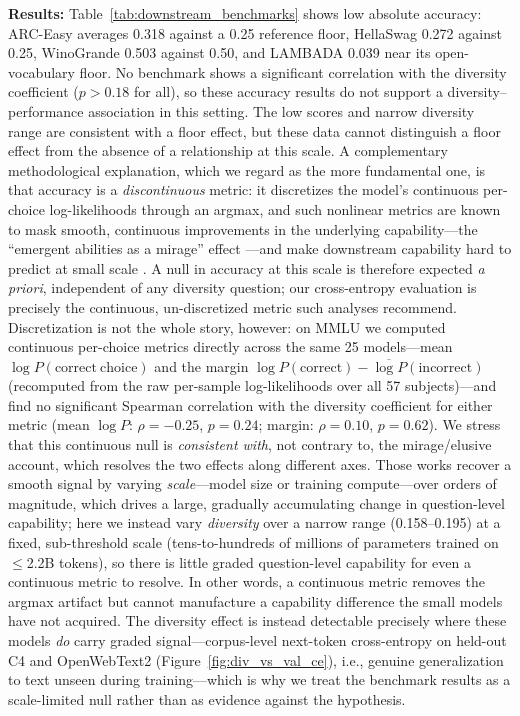 \textbf{Results:}
Table~\ref{tab:downstream_benchmarks} shows low absolute accuracy: ARC-Easy averages 0.318 against a 0.25 reference floor, HellaSwag 0.272 against 0.25, WinoGrande 0.503 against 0.50, and LAMBADA 0.039 near its open-vocabulary floor.
No benchmark shows a significant correlation with the diversity coefficient ($p > 0.18$ for all), so these accuracy results do not support a diversity--performance association in this setting.
The low scores and narrow diversity range are consistent with a floor effect, but these data cannot distinguish a floor effect from the absence of a relationship at this scale.
A complementary methodological explanation, which we regard as the more fundamental one, is that accuracy is a \emph{discontinuous} metric: it discretizes the model's continuous per-choice log-likelihoods through an argmax, and such nonlinear metrics are known to mask smooth, continuous improvements in the underlying capability---the ``emergent abilities as a mirage'' effect \citep{schaeffer2023emergent}---and make downstream capability hard to predict at small scale \citep{schaeffer2024elusive}. A null in accuracy at this scale is therefore expected \emph{a priori}, independent of any diversity question; our cross-entropy evaluation is precisely the continuous, un-discretized metric such analyses recommend.
Discretization is not the whole story, however: on MMLU we computed continuous per-choice metrics directly across the same 25 models---mean $\log P(\mathrm{correct\ choice})$ and the margin $\log P(\mathrm{correct}) - \overline{\log P}(\mathrm{incorrect})$ (recomputed from the raw per-sample log-likelihoods over all 57 subjects)---and find no significant Spearman correlation with the diversity coefficient for either metric (mean $\log P$: $\rho=-0.25$, $p=0.24$; margin: $\rho=0.10$, $p=0.62$).
We stress that this continuous null is \emph{consistent with}, not contrary to, the mirage/elusive account, which resolves the two effects along different axes. Those works recover a smooth signal by varying \emph{scale}---model size or training compute---over orders of magnitude, which drives a large, gradually accumulating change in question-level capability; here we instead vary \emph{diversity} over a narrow range (0.158--0.195) at a fixed, sub-threshold scale (tens-to-hundreds of millions of parameters trained on $\leq$2.2B tokens), so there is little graded question-level capability for even a continuous metric to resolve. In other words, a continuous metric removes the argmax artifact but cannot manufacture a capability difference the small models have not acquired. The diversity effect is instead detectable precisely where these models \emph{do} carry graded signal---corpus-level next-token cross-entropy on held-out C4 and OpenWebText2 (Figure~\ref{fig:div_vs_val_ce}), i.e., genuine generalization to text unseen during training---which is why we treat the benchmark results as a scale-limited null rather than as evidence against the hypothesis.

